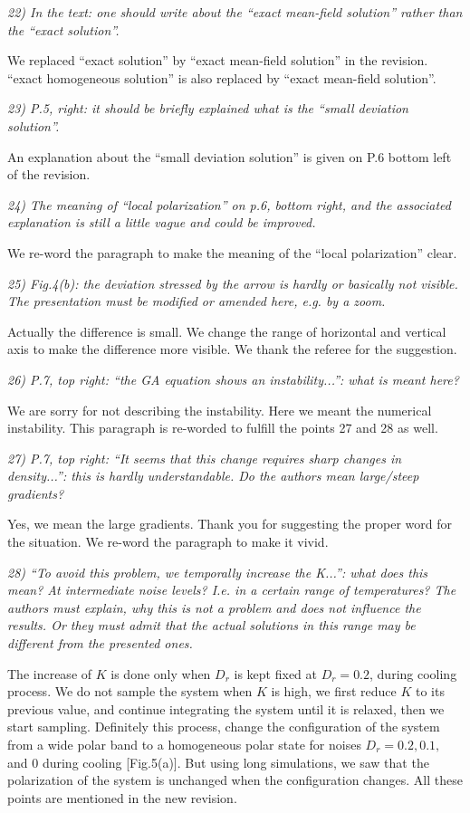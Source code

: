 \documentclass[a4paper,11pt]{letter}
\newcommand{\rf}[1]{\textit{\textcolor{hlcolor}{#1}}}
\begin{document}
\rf{22) In the text: one should write about the ``exact mean-field solution'' rather than the ``exact solution''.}

We replaced ``exact solution'' by ``exact mean-field solution'' in the revision. ``exact homogeneous solution'' is also replaced by ``exact mean-field solution''.

\rf{23) P.5, right: it should be briefly explained what is the ``small deviation solution''.}

An explanation about the ``small deviation solution'' is given on P.6 bottom left of the revision.

\rf{24) The meaning of ``local polarization'' on p.6, bottom right, and the associated explanation is still a little vague and could be improved.}

We re-word the paragraph to make the meaning of the ``local polarization'' clear.

\rf{25) Fig.4(b): the deviation stressed by the arrow is hardly or basically not visible. The presentation must be modified or amended here, e.g. by a zoom.}

Actually the difference is small. We change the range of horizontal and vertical axis to make the difference more visible. We thank the referee for the suggestion.

\rf{26) P.7, top right: ``the GA equation shows an instability...'': what is meant here?}

We are sorry for not describing the instability. Here we meant the numerical instability. This paragraph is re-worded to fulfill the points 27 and 28 as well.

\rf{27) P.7, top right: ``It seems that this change requires sharp changes in density...'': this is hardly understandable. Do the authors mean large/steep gradients?}

Yes, we mean the large gradients. Thank you for suggesting the proper word for the situation. We re-word the paragraph to make it vivid.

\rf{28) ``To avoid this problem, we temporally increase the K...'': what does this mean? At intermediate noise levels? I.e. in a certain range of temperatures? The authors must explain, why this is not a problem and does not influence the results. Or they must admit that the actual solutions in this range may be different from the presented ones.}

The increase of $K$ is done only when $D_r$ is kept fixed at $D_r=0.2$, during cooling process. We do not sample the system when $K$ is high, we first reduce $K$ to its previous value, and continue integrating the system until it is relaxed, then we start sampling. Definitely this process, change the configuration of the system from a wide polar band to a homogeneous polar state for noises $D_r=0.2,0.1,$ and $0$ during cooling [Fig.5(a)]. But using long simulations, we saw that the polarization of the system is unchanged when the configuration changes. All these points are mentioned in the new revision.
\end{document}
